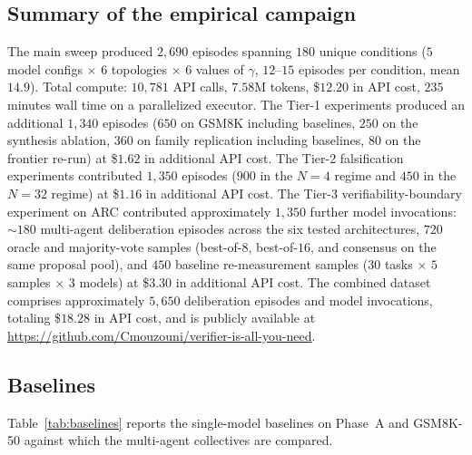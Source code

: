 \documentclass[11pt]{amsart}
\newcommand{\g}{\gamma}
\newcommand\1{{\mathds{1}}}
\theoremstyle{definition}
\theoremstyle{remark}
\numberwithin{equation}{section}
\begin{document}
\subsection{Summary of the empirical campaign}\label{sec:summary}

The main sweep produced $2{,}690$ episodes spanning $180$ unique conditions ($5$ model configs $\times$ $6$ topologies $\times$ $6$ values of $\g$, $12$--$15$ episodes per condition, mean $14.9$).
Total compute: $10{,}781$ API calls, $7.58$M tokens, \$$12.20$ in API cost, $235$ minutes wall time on a parallelized executor.
The Tier-1 experiments produced an additional $1{,}340$ episodes ($650$ on GSM8K including baselines, $250$ on the synthesis ablation, $360$ on family replication including baselines, $80$ on the frontier re-run) at \$$1.62$ in additional API cost.
The Tier-2 falsification experiments contributed $1{,}350$ episodes ($900$ in the $N\!=\!4$ regime and $450$ in the $N\!=\!32$ regime) at \$$1.16$ in additional API cost.
The Tier-3 verifiability-boundary experiment on ARC contributed approximately $1{,}350$ further model invocations: $\sim\!180$ multi-agent deliberation episodes across the six tested architectures, $720$ oracle and majority-vote samples (best-of-$8$, best-of-$16$, and consensus on the same proposal pool), and $450$ baseline re-measurement samples ($30$ tasks $\times$ $5$ samples $\times$ $3$ models) at \$$3.30$ in additional API cost.
The combined dataset comprises approximately $5{,}650$ deliberation episodes and model invocations, totaling \$$18.28$ in API cost, and is publicly available at \url{https://github.com/Cmouzouni/verifier-is-all-you-need}.

\subsection{Baselines}\label{sec:results-baselines}

Table~\ref{tab:baselines} reports the single-model baselines on Phase~A and GSM8K-50 against which the multi-agent collectives are compared.
\end{document}

